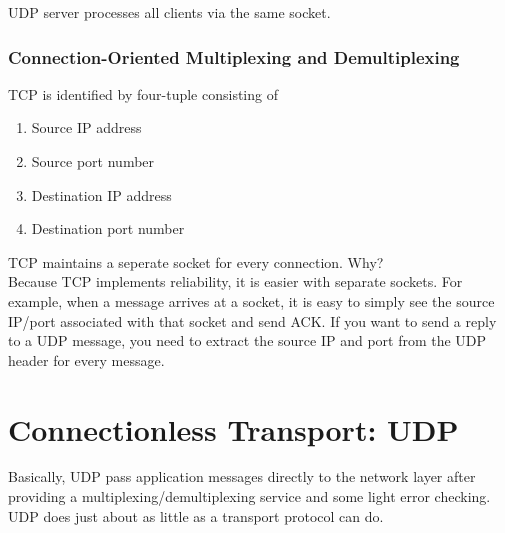UDP server processes all clients via the same socket.

\subsubsection{Connection-Oriented Multiplexing and Demultiplexing}

\hf TCP is identified by four-tuple consisting of
\begin{enumerate}
	\item Source IP address
	\item Source port number
	\item Destination IP address
	\item Destination port number
\end{enumerate}


TCP maintains a seperate socket for every connection. Why?\\

Because TCP implements reliability, it
is easier with separate sockets. For example, when a message arrives
at a socket, it is easy to simply see the source IP/port associated
with that socket and send ACK. If you want to send a reply to a UDP
message, you need to extract the source IP and port from the UDP
header for every message.\\


\section{Connectionless Transport: UDP}

\hf Basically, UDP pass application messages directly to the network layer after providing a multiplexing/demultiplexing service and some light error checking. UDP does just about as little as a transport protocol can do.


